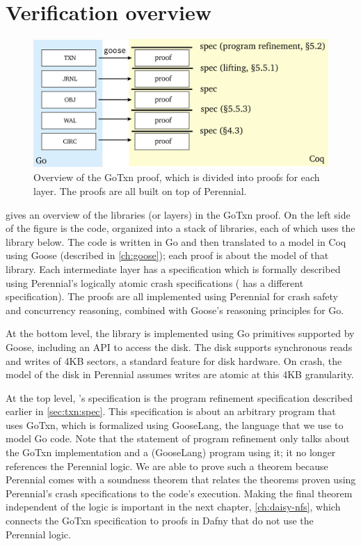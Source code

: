 \section{Verification overview}%
\label{sec:txn:overview}

\begin{figure}
  \includegraphics{fig/gotxn.png}
  \caption{Overview of the GoTxn proof, which is divided into proofs for each
    layer. The proofs are all built on top of Perennial.}
  \label{fig:txn:proof-overview}
\end{figure}

 gives an overview of the libraries (or layers) in
the GoTxn proof. On the left side of the figure is the code, organized into a
stack of libraries, each of which uses the library below. The code is written in
Go and then translated to a model in Coq using Goose (described in
\cref{ch:goose}); each proof is about the model of that library. Each
intermediate layer has a specification which is formally described using
Perennial's logically atomic crash specifications ( has a different
specification). The proofs are all implemented using Perennial for crash safety
and concurrency reasoning, combined with Goose's reasoning principles for Go.

At the bottom level, the  library is implemented using Go primitives
supported by Goose, including an API to access the disk. The disk supports
synchronous reads and writes of 4KB sectors, a standard feature for disk
hardware. On crash, the model of the disk in Perennial assumes writes are atomic
at this 4KB granularity.

At the top level, 's specification is the program refinement
specification described earlier in \cref{sec:txn:spec}. This specification is
about an arbitrary program that uses GoTxn, which is formalized using GooseLang,
the language that we use to model Go code. Note that the statement of program
refinement only talks about the GoTxn implementation and a (GooseLang) program
using it; it no longer references the Perennial logic. We are able to prove such
a theorem because Perennial comes with a soundness theorem that relates the
theorems proven using Perennial's crash specifications to the code's execution.
Making the final theorem independent of the logic is important in the next
chapter, \cref{ch:daisy-nfs}, which connects the GoTxn specification to proofs
in Dafny that do not use the Perennial logic.
